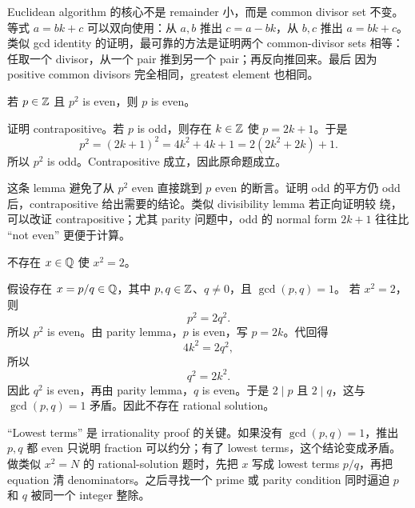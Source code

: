 \begin{explanation}
Euclidean algorithm 的核心不是 remainder 小，而是 common divisor set 不变。
等式 \(a=bk+c\) 可以双向使用：从 \(a,b\) 推出 \(c=a-bk\)，从 \(b,c\) 推出
\(a=bk+c\)。类似 gcd identity 的证明，最可靠的方法是证明两个 common-divisor
sets 相等：任取一个 divisor，从一个 pair 推到另一个 pair；再反向推回来。最后
因为 positive common divisors 完全相同，greatest element 也相同。
\end{explanation}

\begin{lemma}
若 \(p\in\mathbb{Z}\) 且 \(p^2\) is even，则 \(p\) is even。
\end{lemma}

\begin{solution}
证明 contrapositive。若 \(p\) is odd，则存在 \(k\in\mathbb{Z}\) 使 \(p=2k+1\)。于是
\[
  p^2=(2k+1)^2=4k^2+4k+1=2(2k^2+2k)+1.
\]
所以 \(p^2\) is odd。Contrapositive 成立，因此原命题成立。
\end{solution}

\begin{explanation}
这条 lemma 避免了从 \(p^2\) even 直接跳到 \(p\) even 的断言。证明 odd 的平方仍
odd 后，contrapositive 给出需要的结论。类似 divisibility lemma 若正向证明较
绕，可以改证 contrapositive；尤其 parity 问题中，odd 的 normal form
\(2k+1\) 往往比 ``not even'' 更便于计算。
\end{explanation}

\begin{theorem}
不存在 \(x\in\mathbb{Q}\) 使 \(x^2=2\)。
\end{theorem}

\begin{solution}
假设存在 \(x=p/q\in\mathbb{Q}\)，其中 \(p,q\in\mathbb{Z}\)、\(q\neq0\)，且 \(\gcd(p,q)=1\)。
若 \(x^2=2\)，则
\[
  p^2=2q^2.
\]
所以 \(p^2\) is even。由 parity lemma，\(p\) is even，写 \(p=2k\)。代回得
\[
  4k^2=2q^2,
\]
所以
\[
  q^2=2k^2.
\]
因此 \(q^2\) is even，再由 parity lemma，\(q\) is even。于是 \(2\mid p\) 且
\(2\mid q\)，这与 \(\gcd(p,q)=1\) 矛盾。因此不存在 rational solution。
\end{solution}

\begin{explanation}
``Lowest terms'' 是 irrationality proof 的关键。如果没有 \(\gcd(p,q)=1\)，推出
\(p,q\) 都 even 只说明 fraction 可以约分；有了 lowest terms，这个结论变成矛盾。
做类似 \(x^2=N\) 的 rational-solution 题时，先把 \(x\) 写成 lowest terms
\(p/q\)，再把 equation 清 denominators。之后寻找一个 prime 或 parity condition
同时逼迫 \(p\) 和 \(q\) 被同一个 integer 整除。
\end{explanation}

